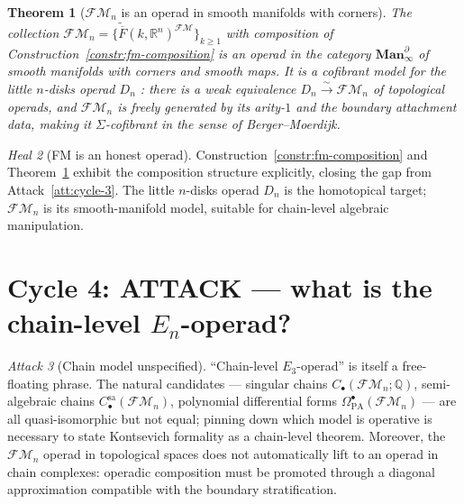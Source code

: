 \documentclass[11pt]{article}
\newtheorem{theorem}{Theorem}[section]
\theoremstyle{definition}
\theoremstyle{remark}
\newtheorem{attack}[theorem]{Attack}
\newtheorem{heal}[theorem]{Heal}
\newcommand{\FMbar}{\overline{F}}
\newcommand{\FM}{\mathcal{FM}}
\newcommand{\Ddisk}{D}
\begin{document}
\begin{theorem}[$\FM_n$ is an operad in smooth manifolds with corners]
\label{thm:fm-operad}
The collection $\FM_n = \{\widetilde{\FMbar}(k, \mathbb{R}^n)^{\FM}\}_{k \geq 1}$
with composition of Construction~\ref{constr:fm-composition} is an
operad in the category $\mathbf{Man}^\partial_\infty$ of smooth
manifolds with corners and smooth maps. It is a cofibrant model for
the little $n$-disks operad $\Ddisk_n$
\cite[Salvatore 2001, Markl--Shnider--Stasheff 2002, Sinha 2004]%
{Salvatore2001, MarklShniderStasheff2002, Sinha2004}: there is a weak
equivalence $\Ddisk_n \xrightarrow{\sim} \FM_n$ of topological operads,
and $\FM_n$ is freely generated by its arity-$1$ and the boundary
attachment data, making it $\Sigma$-cofibrant in the sense of
Berger--Moerdijk.
\end{theorem}

\begin{heal}[FM is an honest operad]
\label{heal:cycle-3}
Construction~\ref{constr:fm-composition} and Theorem~\ref{thm:fm-operad}
exhibit the composition structure explicitly, closing the gap from
Attack~\ref{att:cycle-3}. The little $n$-disks operad $\Ddisk_n$
is the homotopical target; $\FM_n$ is its smooth-manifold model,
suitable for chain-level algebraic manipulation.
\end{heal}

\section{Cycle 4: ATTACK --- what is the chain-level $E_n$-operad?}

\begin{attack}[Chain model unspecified]
\label{att:cycle-4}
``Chain-level $E_3$-operad'' is itself a free-floating phrase. The
natural candidates --- singular chains $C_\bullet(\FM_n; \mathbb{Q})$,
semi-algebraic chains $C^{\mathrm{sa}}_\bullet(\FM_n)$, polynomial
differential forms $\Omega^\bullet_{\mathrm{PA}}(\FM_n)$ --- are all
quasi-isomorphic but not equal; pinning down which model is operative
is necessary to state Kontsevich formality as a chain-level theorem.
Moreover, the $\FM_n$ operad in topological spaces does not automatically
lift to an operad in chain complexes: operadic composition must be
promoted through a diagonal approximation compatible with the boundary
stratification.
\end{attack}
\end{document}
